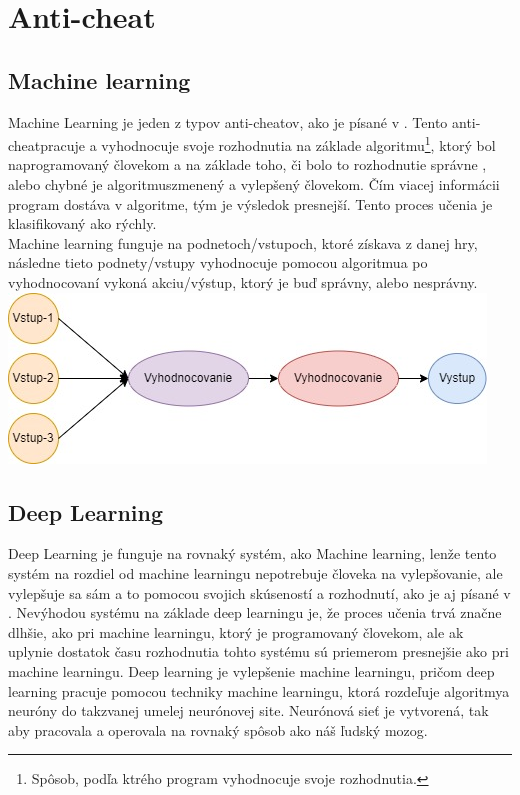 \documentclass[twoside,twocolumn]{article}
\begin{document}

\section{Anti-cheat}
\subsection{Machine learning}
Machine Learning je jeden z typov anti-cheatov\footnotemark[33], ako je písané v \cite{willman2020machine}. Tento anti-cheat\footnotemark[3] pracuje a vyhodnocuje svoje rozhodnutia na základe algoritmu\footnote[8]{Spôsob, podľa ktrého program vyhodnocuje svoje rozhodnutia.}, ktorý bol naprogramovaný človekom a na základe toho, či bolo to rozhodnutie správne , alebo chybné je algoritmus\footnotemark[8] zmenený a vylepšený človekom. Čím viacej informácii program dostáva v algoritme\footnotemark[8], tým je výsledok presnejší. Tento proces učenia je klasifikovaný ako rýchly. \\
Machine learning funguje na podnetoch/vstupoch, ktoré získava z danej hry, následne tieto podnety/vstupy vyhodnocuje pomocou algoritmu\footnotemark[8] a po vyhodnocovaní vykoná akciu/výstup, ktorý je buď správny, alebo nesprávny.\\

\textnormal{\includegraphics[scale=0.42]{Machine learning proces diagram.jpg}}
\label{machine learning proces}


\subsection{Deep Learning}
Deep Learning je funguje na rovnaký systém, ako Machine learning, lenže tento systém na rozdiel od machine learningu nepotrebuje človeka na vylepšovanie, ale vylepšuje sa sám a to pomocou svojich skúseností a rozhodnutí, ako je aj písané v \cite{zhang2021improvement}. Nevýhodou systému na základe deep learningu je, že proces učenia trvá značne dlhšie, ako pri machine learningu, ktorý je programovaný človekom, ale ak uplynie dostatok času rozhodnutia tohto systému sú priemerom presnejšie ako pri machine learningu.
Deep learning je vylepšenie machine learningu, pričom deep learning pracuje pomocou techniky machine learningu, ktorá rozdeľuje algoritmy\footnotemark[8] a neuróny do takzvanej umelej neurónovej site. Neurónová sieť je vytvorená, tak aby pracovala a operovala na rovnaký spôsob ako náš ľudský mozog.
\newpage
\end{document}
